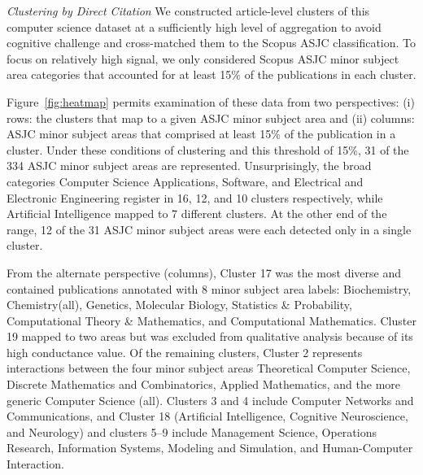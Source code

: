 \emph{Clustering by Direct Citation} We constructed article-level clusters of this computer science dataset at a sufficiently high level of aggregation to avoid cognitive challenge and cross-matched them to the Scopus ASJC classification. To focus on relatively high signal, we only considered Scopus ASJC minor subject area categories that accounted for at least 15\% of the publications in each cluster. 

Figure~\ref{fig:heatmap} permits examination of these data from two perspectives: (i) rows: the clusters that map to a given ASJC minor subject area and (ii) columns: ASJC minor subject areas that comprised at least 15\% of the publication in a cluster. Under these conditions of clustering and this threshold of 15\%, 31 of the 334 ASJC minor subject areas are represented. Unsurprisingly, the broad categories Computer Science Applications, Software, and Electrical and Electronic Engineering register in 16, 12, and 10 clusters respectively, while Artificial Intelligence mapped to 7 different clusters. At the other end of the range, 12 of the 31 ASJC minor subject areas were each detected only in a single cluster. 

From the alternate perspective (columns), Cluster 17 was the most diverse and contained publications annotated with 8 minor subject area labels: Biochemistry, Chemistry(all), Genetics, Molecular Biology,  Statistics \& Probability, Computational Theory \& Mathematics, and Computational Mathematics. Cluster 19 mapped to two areas but was excluded from qualitative analysis because of its high conductance value. 
Of the remaining clusters, Cluster 2 represents interactions between the four minor subject areas Theoretical Computer Science, Discrete Mathematics and Combinatorics, Applied Mathematics,  and the more generic Computer Science (all). Clusters 3 and 4 include Computer Networks and Communications, and Cluster 18 (Artificial Intelligence, Cognitive Neuroscience, and Neurology) and clusters 5--9 include Management Science, Operations Research, Information Systems, Modeling and Simulation, and Human-Computer Interaction.

